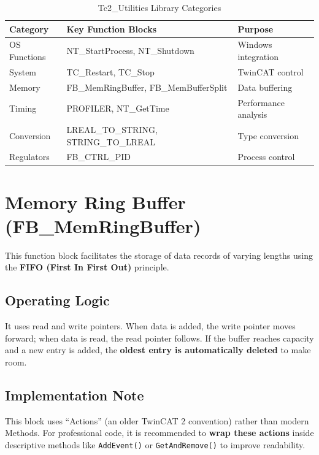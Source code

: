 \documentclass[11pt,a4paper]{article}
\begin{document}
\begin{table}[h]
\centering
\begin{tabular}{@{}lll@{}}
\toprule
\textbf{Category} & \textbf{Key Function Blocks} & \textbf{Purpose} \\
\midrule
OS Functions & NT\_StartProcess, NT\_Shutdown & Windows integration \\
System & TC\_Restart, TC\_Stop & TwinCAT control \\
Memory & FB\_MemRingBuffer, FB\_MemBufferSplit & Data buffering \\
Timing & PROFILER, NT\_GetTime & Performance analysis \\
Conversion & LREAL\_TO\_STRING, STRING\_TO\_LREAL & Type conversion \\
Regulators & FB\_CTRL\_PID & Process control \\
\bottomrule
\end{tabular}
\caption{Tc2\_Utilities Library Categories}
\end{table}

\section{Memory Ring Buffer (FB\_MemRingBuffer)}

This function block facilitates the storage of data records of varying lengths using the \textbf{FIFO (First In First Out)} principle.

\subsection{Operating Logic}

It uses read and write pointers. When data is added, the write pointer moves forward; when data is read, the read pointer follows. If the buffer reaches capacity and a new entry is added, the \textbf{oldest entry is automatically deleted} to make room.

\subsection{Implementation Note}

This block uses ``Actions'' (an older TwinCAT 2 convention) rather than modern Methods. For professional code, it is recommended to \textbf{wrap these actions} inside descriptive methods like \texttt{AddEvent()} or \texttt{GetAndRemove()} to improve readability.
\end{document}
